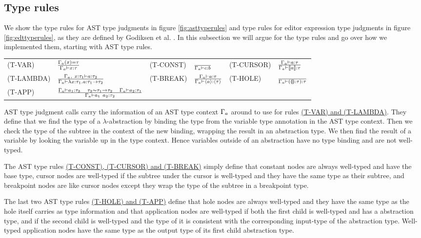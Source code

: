 \subsection{Type rules}

We show the type rules for AST type judgments in figure \ref{fig:asttyperules}
and type rules for editor expression type judgments in figure
\ref{fig:edttyperules}, as they are defined by Godiksen et al. \pepm. In this
subsection we will argue for the type rules and go over how we implemented
them, starting with AST type rules.

\begin{figure*}
  \center
  \renewcommand{\arraystretch}{2}
  \begin{tabular}{llllll}
    \scriptsize(T-VAR)    & $ \frac{\Gamma_{a}(x) = \tau} {\Gamma_{a} \vdash x : \tau} $   & \scriptsize(T-CONST) & $ \frac{} {\Gamma_{a} \vdash c : b}$ & \scriptsize(T-CURSOR) & $ \frac{\Gamma_{a} \vdash a : \tau} {\Gamma_{a} \vdash \llbracket a \rrbracket : \tau} $ \\
    \scriptsize(T-LAMBDA) & $ \frac{\Gamma_{a},~x : \tau_1 \vdash a : \tau_2} {\Gamma_{a} \vdash \lambda x : \tau_1.a : \tau_1\to\tau_2}$ & \scriptsize(T-BREAK) & $\frac{\Gamma_{a} \vdash a : \tau} {\Gamma_{a} \vdash \langle a \rangle : \langle \tau \rangle}$  & \scriptsize(T-HOLE)   & $\frac{} {\Gamma_{a} \vdash (\llparenthesis\rrparenthesis : \tau) : \tau}$     \\
    \scriptsize(T-APP)    & $\frac{\Gamma_{a} \vdash a_1 : \tau_3 \quad \tau_3\sim\tau_1\to\tau_2 \quad \Gamma_{a} \vdash a_2 : \tau_1} {\Gamma_{a} \vdash a_1~a_2 : \tau_2}$     &                      &            &                       &
  \end{tabular}
  \caption{AST type rules}
  \label{fig:asttyperules}
\end{figure*}

AST type judgment calls carry the information of an AST type context $\Gamma_{a}$
around to use for rules \hyperref[fig:asttyperules]{(T-VAR) and (T-LAMBDA)}.
They define that we find the type of a $\lambda$-abstraction by binding the type
from the variable type annotation in the AST type context. Then we check
the type of the subtree in the context of the new binding, wrapping the
result in an abstraction type. We then find the result of a variable by looking
the variable up in the type context. Hence variables outside of an abstraction
have no type binding and are not well-typed.

The AST type rules \hyperref[fig:asttyperules]{(T-CONST), (T-CURSOR) and
(T-BREAK)} simply define that constant nodes are always well-typed and have the
base type, cursor nodes are well-typed if the subtree under the cursor is
well-typed and they have the same type as their subtree, and breakpoint nodes
are like cursor nodes except they wrap the type of the subtree in a breakpoint
type.

The last two AST type rules \hyperref[fig:asttyperules]{(T-HOLE) and (T-APP)}
define that hole nodes are always well-typed and they have the same type as
the hole itself carries as type information and that application nodes are
well-typed if both the first child is well-typed and has a abstraction type,
and if the second child is well-typed and the type of it is consistent with the
corresponding input-type of the abstraction type. Well-typed application nodes
have the same type as the output type of its first child abstraction type. \\

